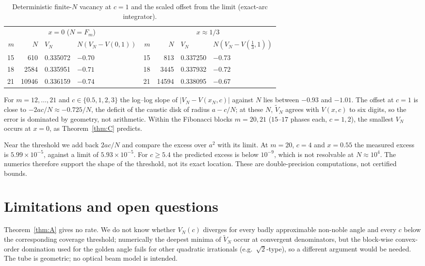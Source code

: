 \documentclass[11pt]{amsart}
\theoremstyle{remark}
\begin{document}
\begin{table}[ht]
\centering
\begin{tabular}{@{}rrllrrll@{}}
\toprule
\multicolumn{4}{c}{$x=0$ ($N=F_m$)} & \multicolumn{4}{c}{$x\approx1/3$}\\
$m$ & $N$ & $V_N$ & $N(V_N-V(0,1))$ & $m$ & $N$ & $V_N$ & $N(V_N-V(\tfrac13,1))$\\
\midrule
15 & 610 & 0.335072 & $-0.70$ & 15 & 813 & 0.337250 & $-0.73$\\
18 & 2584 & 0.335951 & $-0.71$ & 18 & 3445 & 0.337932 & $-0.72$\\
21 & 10946 & 0.336159 & $-0.74$ & 21 & 14594 & 0.338095 & $-0.67$\\
\bottomrule
\end{tabular}
\caption{Deterministic finite-$N$ vacancy at $c=1$ and the scaled offset from the limit (exact-arc integrator).}\label{tab:det}
\end{table}
For $m=12,\dots,21$ and $c\in\{0.5,1,2,3\}$ the log--log slope of $|V_N-V(x_N,c)|$ against
$N$ lies between $-0.93$ and $-1.01$. The offset at $c=1$ is close to $-2ac/N\approx-0.725/N$,
the deficit of the caustic disk of radius $a-c/N$; at these $N$, $\widetilde V_N$ agrees with
$V(x,c)$ to six digits, so the error is dominated by geometry, not arithmetic. Within the
Fibonacci blocks $m=20,21$ ($15$--$17$ phases each, $c=1,2$), the smallest $V_N$ occurs at
$x=0$, as Theorem~\ref{thm:C} predicts.

Near the threshold we add back $2ac/N$ and compare the excess over $a^2$ with its limit.
At $m=20$, $c=4$ and $x=0.55$ the measured excess is $5.99\times10^{-5}$, against a limit
of $5.93\times10^{-5}$. For $c\ge5.4$ the predicted excess is below $10^{-9}$, which is not
resolvable at $N\approx10^4$. The numerics therefore support the shape of the threshold,
not its exact location. These are double-precision computations, not certified bounds.

\section{Limitations and open questions}\label{sec:open}

Theorem~\ref{thm:A} gives no rate. We do not know whether $V_N(c)$ diverges for every
badly approximable non-noble angle and every $c$ below the corresponding coverage
threshold; numerically the deepest minima of $\widetilde V_N$ occur at convergent
denominators, but the block-wise convex-order domination used for the golden angle
fails for other quadratic irrationals (e.g.\ $\sqrt2$-type), so a different argument
would be needed. The tube is geometric; no optical beam model is intended.
\end{document}
